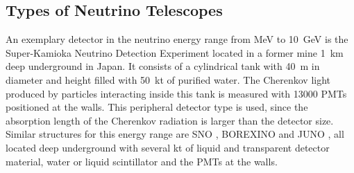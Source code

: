 
\subsection{Types of Neutrino Telescopes}

An exemplary detector in the neutrino energy range from MeV to \SI{10}{GeV} is the Super-Kamioka Neutrino Detection Experiment \cite{HyperKamiokande18} located in a former mine \SI{1}{km} deep underground in Japan.
It consists of a cylindrical tank with \SI{40}{m} in diameter and height filled with \SI{50}{kt} of purified water.
The Cherenkov light produced by particles interacting inside this tank is measured with \num{13000} PMTs positioned at the walls.
This peripheral detector type is used, since the absorption length of the Cherenkov radiation is larger than the detector size.
Similar structures for this energy range are SNO \cite{SNO20}, BOREXINO \cite{Borexino09} and JUNO \cite{JUNO19}, all located deep underground with several kt of liquid and transparent detector material, water or liquid scintillator and the PMTs at the walls.

